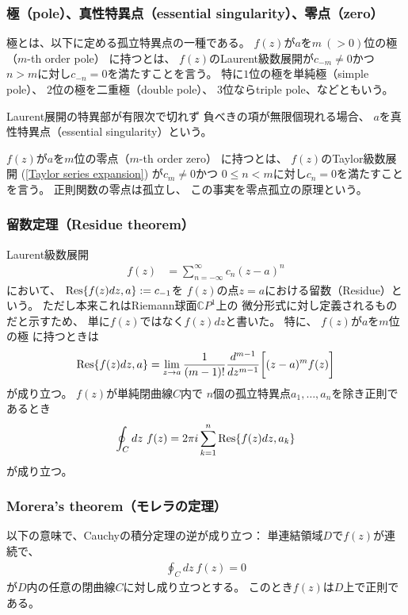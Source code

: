 \subsubsection{極（pole）、真性特異点（essential singularity）、零点（zero）}

極とは、以下に定める孤立特異点の一種である。
$f(z)$が$a$を$m\ (>0)$位の極（$m$-th order pole）
に持つとは、
$f(z)$のLaurent級数展開が$c_{-m} \neq 0$かつ
$n>m$に対し$c_{-n}=0$を満たすことを言う。
特に$1$位の極を単純極（simple pole）、
$2$位の極を二重極（double pole）、
$3$位ならtriple pole、などともいう。

Laurent展開の特異部が有限次で切れず
負べきの項が無限個現れる場合、
$a$を真性特異点（essential singularity）という。

$f(z)$が$a$を$m$位の零点（$m$-th order zero）
に持つとは、
$f(z)$のTaylor級数展開
(\ref{Taylor series expansion})
が$c_{m} \neq 0$かつ
$0 \le n < m$に対し$c_{n}=0$を満たすことを言う。
正則関数の零点は孤立し、
この事実を零点孤立の原理という。

\subsubsection{留数定理（Residue theorem）}

Laurent級数展開
\begin{align}
    f(z)
    &= \sum_{n=-\infty}^{\infty}
        c_n (z-a)^n
\end{align}
において、
$\Res{f(z)dz, a} := c_{-1}$を
$f(z)$の点$z=a$における留数（Residue）という。
ただし本来これはRiemann球面$\mathbb{C}P^1$上の
微分形式に対し定義されるものだと示すため、
単に$f(z)$ではなく$f(z)dz$と書いた。
特に、
$f(z)$が$a$を$m$位の極
に持つときは
\begin{align}
    \Res{f(z)dz, a}
    =
    \lim_{z \to a}
    \dfrac{1}{(m-1)!}
    \dfrac{d^{m-1}}{dz^{m-1}}
    \bigg[
        (z-a)^m f(z)
    \bigg]
\end{align}
が成り立つ。
$f(z)$が単純閉曲線$C$内で
$n$個の孤立特異点$a_1,\dots,a_n$を除き正則であるとき
\begin{align}
    \oint_C dz\ f(z)
    =
    2 \pi i \sum_{k=1}^n
    \Res{f(z)dz, a_k}
\end{align}
が成り立つ。

\subsubsection{Morera's theorem（モレラの定理）}

以下の意味で、Cauchyの積分定理の逆が成り立つ：
単連結領域$D$で$f(z)$が連続で、
\begin{align}
    \oint_C dz\ f(z) = 0
\end{align}
が$D$内の任意の閉曲線$C$に対し成り立つとする。
このとき$f(z)$は$D$上で正則である。

